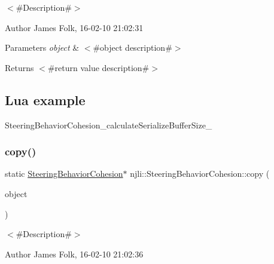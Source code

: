 $<$\#\+Description\#$>$ 

\begin{DoxyAuthor}{Author}
James Folk, 16-\/02-\/10 21\+:02\+:31
\end{DoxyAuthor}

\begin{DoxyParams}{Parameters}
{\em object} & $<$\#object description\#$>$\\
\hline
\end{DoxyParams}
\begin{DoxyReturn}{Returns}
$<$\#return value description\#$>$
\end{DoxyReturn}
\hypertarget{classnjli_1_1_steering_behavior_wander_ex1}{}\subsection{Lua example}\label{classnjli_1_1_steering_behavior_wander_ex1}

\begin{DoxyCodeInclude}
\end{DoxyCodeInclude}
Steering\+Behavior\+Cohesion\+\_\+calculate\+Serialize\+Buffer\+Size\+\_\+ \mbox{\label{classnjli_1_1_steering_behavior_cohesion_a6685c161ed3cb8a28b47542361c2fe96}} 
\subsubsection{\texorpdfstring{copy()}{copy()}}
{\footnotesize\ttfamily static \mbox{\hyperlink{classnjli_1_1_steering_behavior_cohesion}{Steering\+Behavior\+Cohesion}}$\ast$ njli\+::\+Steering\+Behavior\+Cohesion\+::copy (\begin{DoxyParamCaption}\item[{const \mbox{\hyperlink{classnjli_1_1_steering_behavior_cohesion}{Steering\+Behavior\+Cohesion}} \&}]{object }\end{DoxyParamCaption})\hspace{0.3cm}{\ttfamily [static]}}



$<$\#\+Description\#$>$ 

\begin{DoxyAuthor}{Author}
James Folk, 16-\/02-\/10 21\+:02\+:36
\end{DoxyAuthor}

